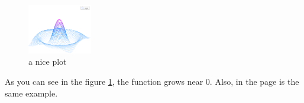 \documentclass{article}
\begin{document}
\begin{figure}[h]
    \centering
    \includegraphics[width=0.25\textwidth]{mesh}
    \caption{a nice plot}
    \label{fig:mesh1}
\end{figure}
 
As you can see in the figure \ref{fig:mesh1}, the 
function grows near 0. Also, in the page \pageref{fig:mesh1} 
is the same example.
\end{document}
